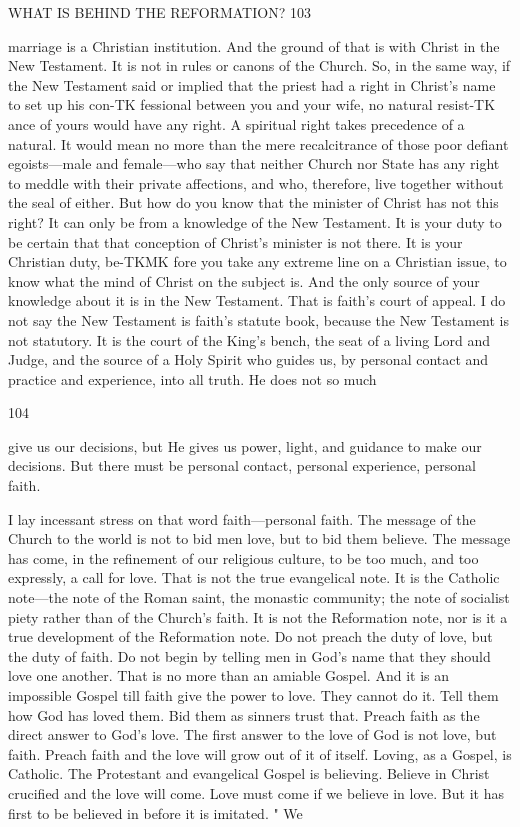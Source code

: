 \documentclass[12pt,a5paper,oneside]{book}
\begin{document}
WHAT IS BEHIND THE REFORMATION? 103 

marriage is a Christian institution. And the ground 
of that is with Christ in the New Testament. It is 
not in rules or canons of the Church. So, in the same 
way, if the New Testament said or implied that the 
priest had a right in Christ's name to set up his con-TK
fessional between you and your wife, no natural resist-TK
ance of yours would have any right. A spiritual right 
takes precedence of a natural. It would mean no 
more than the mere recalcitrance of those poor defiant 
egoists---male and female---who say that neither Church 
nor State has any right to meddle with their private 
affections, and who, therefore, live together without 
the seal of either. But how do you know that the 
minister of Christ has not this right? It can only be 
from a knowledge of the New Testament. It is your 
duty to be certain that that conception of Christ's 
minister is not there. It is your Christian duty, be-TKMK 
fore you take any extreme line on a Christian issue, to 
know what the mind of Christ on the subject is. 
And the only source of your knowledge about it is in 
the New Testament. That is faith's court of appeal. 
I do not say the New Testament is faith's statute 
book, because the New Testament is not statutory. 
It is the court of the King's bench, the seat of a 
living Lord and Judge, and the source of a Holy 
Spirit who guides us, by personal contact and practice 
and experience, into all truth. He does not so much 



104 

give us our decisions, but He gives us power, light, and 
guidance to make our decisions. But there must be 
personal contact, personal experience, personal faith. 

I lay incessant stress on that word faith---personal 
faith. The message of the Church to the world is 
not to bid men love, but to bid them believe. The 
message has come, in the refinement of our religious 
culture, to be too much, and too expressly, a call for 
love. That is not the true evangelical note. It is 
the Catholic note---the note of the Roman saint, the 
monastic community; the note of socialist piety rather 
than of the Church's faith. It is not the Reformation 
note, nor is it a true development of the Reformation 
note. Do not preach the duty of love, but the duty 
of faith. Do not begin by telling men in God's 
name that they should love one another. That is no 
more than an amiable Gospel. And it is an impossible 
Gospel till faith give the power to love. They cannot 
do it. Tell them how God has loved them. Bid 
them as sinners trust that. Preach faith as the direct 
answer to God's love. The first answer to the love of 
God is not love, but faith. Preach faith and the love 
will grow out of it of itself. Loving, as a Gospel, is 
Catholic. The Protestant and evangelical Gospel is 
believing. Believe in Christ crucified and the love will 
come. Love must come if we believe in love. But it 
has first to be believed in before it is imitated. " We 
\end{document}
